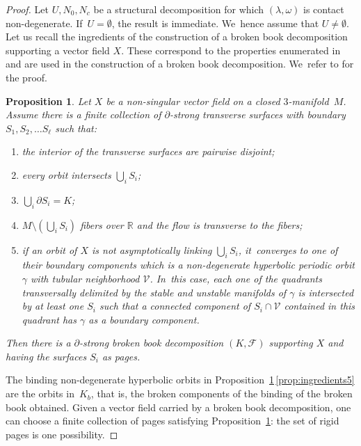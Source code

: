 \documentclass[JEP,XML,SOM,Unicode,NoEqCountersInSection,NoFloatCountersInSection,published]{cedram}
\newcommand{\threemanifold}{$3$\nobreakdash-mani\-fold\xspace}
\newtheorem{prop}[theorem]{Proposition}
\theoremstyle{definition}
\begin{document}
\begin{proof}
Let $U, N_0, N_c$ be a structural decomposition for which $(\lambda,\omega)$ is contact non-degenerate. If~$U=\emptyset$, the result is immediate. We~hence assume that $U\neq \emptyset$. Let us recall the ingredients of the construction of a broken book decomposition supporting a vector field $X$. These correspond to the properties enumerated in \cite[Lem.\,3.6]{CDR} and are used in the construction of a broken book decomposition. We~refer to \cite[\S 3]{CDR} for the proof.

\begin{prop}\label{prop:ingredients}
Let $X$ be a non-singular vector field on a closed \threemanifold~$M$. Assume there is a finite collection of $\partial$-strong transverse surfaces with boundary $S_1, S_2, \ldots S_\ell$ such that:
\begin{enumerate}
\item\label{prop:ingredients1} the {interior of the} transverse surfaces {are pairwise disjoint};
\item\label{prop:ingredients2} every orbit intersects $\bigcup_i S_i$;
\item\label{prop:ingredients3} $\bigcup_i\partial S_i= K$;
\item\label{prop:ingredients4} $M\setminus \left(\bigcup_i S_i\right)$ fibers over $\mathbb{R}$ and the flow is transverse to the fibers;
\item\label{prop:ingredients5} if an orbit of $X$ is not asymptotically linking $\bigcup_i S_i$, it~converges to one of their boundary components which is a non-degenerate hyperbolic periodic orbit $\gamma$ with tubular neighborhood $\mathcal{V}$. In~this case, each one of the quadrants transversally delimited by the stable and unstable manifolds of $\gamma$ is intersected by at least one $S_i$ such that a connected component of $S_i\cap \mathcal{V}$ contained in this quadrant has $\gamma$ as a boundary component.
\end{enumerate}
Then there is a $\partial$-strong broken book decomposition $(K,\mathcal{F})$ supporting $X$ and having the surfaces $S_i$ as pages.
\end{prop}

The binding non-degenerate hyperbolic orbits in Proposition~\ref{prop:ingredients}\,\eqref{prop:ingredients5} are the orbits in~$K_b$, that is, the broken components of the binding of the broken book obtained. Given a vector field carried by a broken book decomposition, one can choose a finite collection of pages satisfying Proposition~\ref{prop:ingredients}: the set of rigid pages is one possibility.


\end{proof}
\end{document}

